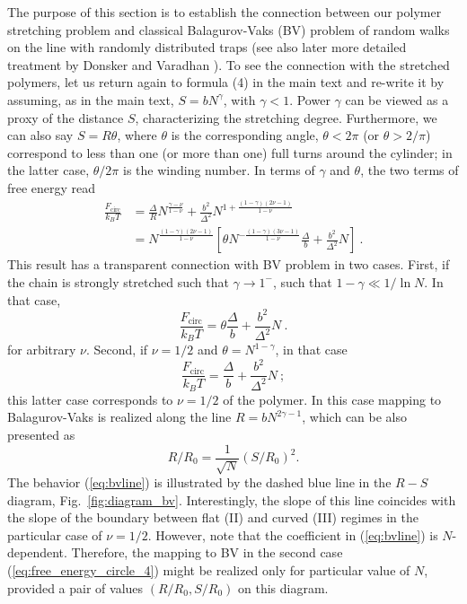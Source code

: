 \documentclass[aps,pre,floatfix,twocolumn,nofootinbib]{revtex4-2}
\newcommand{\be}{\begin{equation}}
\newcommand{\ee}{\end{equation}}
\newcommand{\eq}[1]{(\ref{#1})}
\newcommand{\fig}[1]{Fig.~\ref{#1}}
\begin{document}
The purpose of this section is to establish the connection between our polymer stretching problem and classical Balagurov-Vaks (BV) problem of random walks on the line with randomly distributed traps \cite{balagurov}  (see also later more detailed treatment by Donsker and Varadhan \cite{donsker}).
To see the connection with the stretched polymers, let us return again to formula (4) in the main text and re-write it by assuming, as in the main text, $S = b N^{\gamma}$, with $\gamma < 1$.  Power $\gamma$ can be viewed as a proxy of the distance $S$, characterizing the stretching degree.  Furthermore, we can also say $S = R \theta$, where $\theta$ is the corresponding angle, $\theta<2\pi$ (or $\theta > 2/\pi$) correspond to less than one (or more than one) full turns around the cylinder; in the latter case, $\theta / 2 \pi$ is the winding number. In terms of $\gamma$ and $\theta$, the two terms of free energy read
\be \begin{split}
\frac{F_{\mathrm{circ}}}{k_B T} &  = \frac{\Delta}{R} N^{\frac{\gamma - \nu}{1-\nu}} + \frac{b^2 }{\Delta^2} N^{1+\frac{(1-\gamma )(2\nu-1)}{1-\nu}}  \\ & = N^{\frac{(1-\gamma )(2\nu-1)}{1-\nu}} \left[ \theta N^{-\frac{(1-\gamma)(3 \nu -1 )}{1-\nu}} \frac{\Delta}{b} + \frac{b^2 }{\Delta^2} N \right]  \ .
\label{eq:free_energy_circle_2}
\end{split}
\ee
This result has a transparent connection with BV problem in two cases.  First, if the chain is strongly stretched such that $\gamma \to 1^{-}$, such that $1 - \gamma \ll 1/\ln N$. In that case,
\be
\frac{F_{\mathrm{circ}}}{k_B T}    =  \theta  \frac{\Delta}{b} + \frac{b^2 }{\Delta^2} N  \ .
\label{eq:free_energy_circle_3}
\ee
for arbitrary $\nu$.  Second, if $\nu = 1/2$ and $\theta = N^{1-\gamma}$, in that case
\be
\frac{F_{\mathrm{circ}}}{k_B T}    =   \frac{\Delta}{b} + \frac{b^2 }{\Delta^2} N  \ ;
\label{eq:free_energy_circle_4}
\ee
this latter case corresponds to $\nu = 1/2$ of the polymer. In this case mapping to Balagurov-Vaks is realized along the line $R = b N^{2 \gamma -1}$, which can be also presented as
\be
R/R_0=\frac{1}{\sqrt{N}} \left(S/R_0\right)^2.
\label{eq:bvline}
\ee
The behavior \eq{eq:bvline} is illustrated by the dashed blue line in the $R-S$ diagram, \fig{fig:diagram_bv}.
Interestingly, the slope of this line coincides with the slope of the boundary between flat (II) and curved (III) regimes in the particular case of $\nu=1/2$. However, note that the coefficient in \eq{eq:bvline} is $N$-dependent. Therefore, the mapping to BV in the second case \eq{eq:free_energy_circle_4} might be realized only for particular value of $N$, provided a pair of values $(R/R_0, S/R_0)$ on this diagram.
\end{document}

